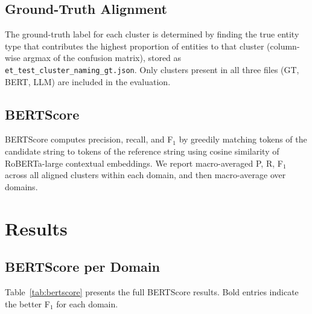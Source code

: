 \documentclass[11pt,a4paper]{article}
\begin{document}
\subsection{Ground-Truth Alignment}

The ground-truth label for each cluster is determined by finding the
true entity type that contributes the highest proportion of entities to
that cluster (column-wise argmax of the confusion matrix), stored as
\texttt{et\_test\_cluster\_naming\_gt.json}.
Only clusters present in all three files (GT, BERT, LLM) are included in
the evaluation.

\subsection{BERTScore}

BERTScore computes precision, recall, and F$_1$ by greedily matching
tokens of the candidate string to tokens of the reference string using
cosine similarity of RoBERTa-large contextual embeddings.
We report macro-averaged P, R, F$_1$ across all aligned clusters within
each domain, and then macro-average over domains.

\section{Results}

\subsection{BERTScore per Domain}

Table~\ref{tab:bertscore} presents the full BERTScore results.
Bold entries indicate the better F$_1$ for each domain.
\end{document}
